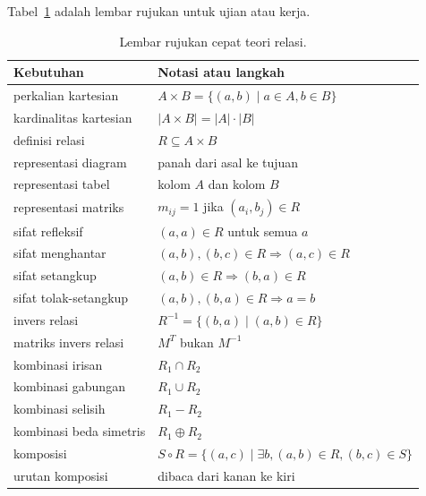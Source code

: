 \documentclass[11pt,a4paper]{article}
\begin{document}
Tabel~\ref{tab:rujukan-cepat} adalah lembar rujukan untuk ujian atau kerja.

\begin{table}[H]
	\centering
	\caption{Lembar rujukan cepat teori relasi.}
	\label{tab:rujukan-cepat}
	\footnotesize
	\begin{tabularx}{\textwidth}{l X}
		\toprule
		Kebutuhan               & Notasi atau langkah                                            \\
		\midrule
		perkalian kartesian     & $A \times B=\{(a,b) \mid a \in A, b \in B\}$                   \\
		kardinalitas kartesian  & $|A \times B|=|A| \cdot |B|$                                   \\
		definisi relasi         & $R \subseteq A \times B$                                       \\
		representasi diagram    & panah dari asal ke tujuan                                      \\
		representasi tabel      & kolom $A$ dan kolom $B$                                        \\
		representasi matriks    & $m_{ij}=1$ jika $(a_i,b_j) \in R$                              \\
		sifat refleksif         & $(a,a) \in R$ untuk semua $a$                                  \\
		sifat menghantar        & $(a,b),(b,c) \in R \Rightarrow (a,c) \in R$                    \\
		sifat setangkup         & $(a,b) \in R \Rightarrow (b,a) \in R$                          \\
		sifat tolak-setangkup   & $(a,b),(b,a) \in R \Rightarrow a=b$                            \\
		invers relasi           & $R^{-1}=\{(b,a) \mid (a,b) \in R\}$                            \\
		matriks invers relasi   & $M^T$ bukan $M^{-1}$                                           \\
		kombinasi irisan        & $R_1 \cap R_2$                                                 \\
		kombinasi gabungan      & $R_1 \cup R_2$                                                 \\
		kombinasi selisih       & $R_1-R_2$                                                      \\
		kombinasi beda simetris & $R_1 \oplus R_2$                                               \\
		komposisi               & $S \circ R=\{(a,c) \mid \exists b, (a,b) \in R, (b,c) \in S\}$ \\
		urutan komposisi        & dibaca dari kanan ke kiri                                      \\
		\bottomrule
	\end{tabularx}
\end{table}
\end{document}
